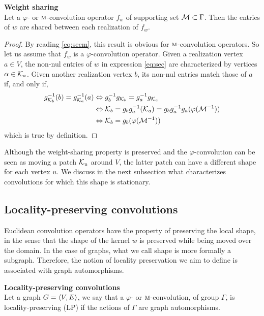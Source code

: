 \begin{proposition}\textbf{Weight sharing}\\
Let a $\varphi$- or $\operatorname{\textsc{m}}$-convolution operator $f_w$ of supporting set $\mathcal{M} \subset \Gamma$. Then the entries of $w$ are shared between each realization of $f_w$.
\end{proposition}
\begin{proof}
By reading \eqref{eq:secm}, this result is obvious for $\operatorname{\textsc{m}}$-convolution operators. So let us assume that $f_w$ is a $\varphi$-convolution operator. Given a realization vertex $a \in V$, the non-nul entries of $w$ in expression \eqref{eq:sec} are characterized by vertices $\alpha \in \mathcal{K}_a$. Given another realization vertex $b$, its non-nul entries match those of $a$ if, and only if,
\begin{align*}
g_{\mathcal{K}_b}^{-1}(b) = g_{\mathcal{K}_a}^{-1}(a)
  & \Leftrightarrow  g_{b}^{-1}g_{\mathcal{K}_{b}} = g_a^{-1}g_{\mathcal{K}_a}\\
  & \Leftrightarrow  \mathcal{K}_{b} = g_{b}g_a^{-1}(\mathcal{K}_a) = g_{b}g_a^{-1}g_a(\varphi(\mathcal{M}^{-1}))\\
  & \Leftrightarrow  \mathcal{K}_{b} = g_{b}(\varphi(\mathcal{M}^{-1}))
\end{align*}
which is true by definition.
\end{proof}

Although the weight-sharing property is preserved and the $\varphi$-convolution can be seen as moving a patch $\mathcal{K}_u$ around $V$, the latter patch can have a different shape for each vertex $u$. We discuss in the next subsection what characterizes convolutions for which this shape is stationary.

\subsection{Locality-preserving convolutions}

Euclidean convolution operators have the property of preserving the local shape, in the sense that the shape of the kernel $w$ is preserved while being moved over the domain. In the case of graphs, what we call shape is more formally a subgraph. Therefore, the notion of locality preservation we aim to define is associated with graph automorphisms.

\begin{definition}\textbf{Locality-preserving convolutions}\\
Let a graph $G = \langle V, E \rangle$, we say that a $\varphi$- or $\operatorname{\textsc{m}}$-convolution, of group $\Gamma$, is locality-preserving (LP) if the actions of $\Gamma$ are graph automorphisms.
\end{definition}

